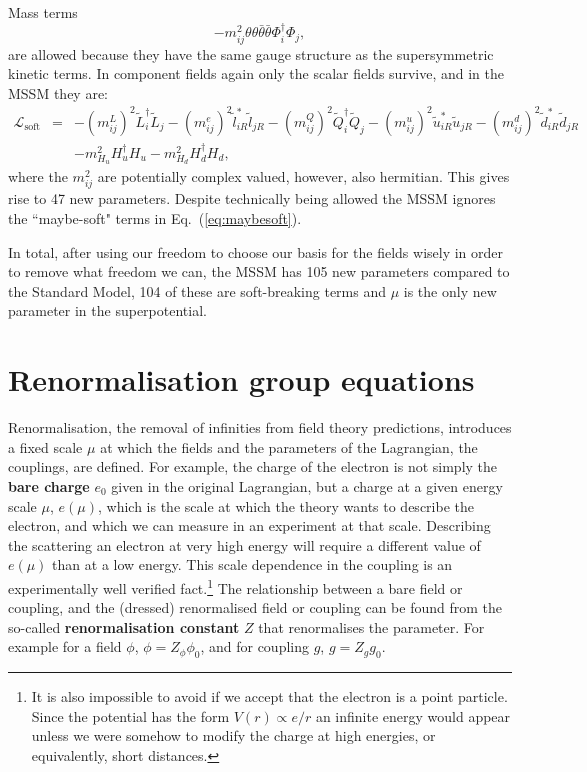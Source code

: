\documentclass[notes.tex]{subfiles}
\begin{document}
Mass terms
\[-m_{ij}^2\theta\theta\bar{\theta}\bar{\theta}\Phi^\dagger_i \Phi_j,\]
are allowed because they have the same gauge structure as the supersymmetric kinetic terms. In component fields again only the scalar fields survive, and in the MSSM they are:
\begin{eqnarray}
\mathcal L_\text{soft} &=& -(m^L_{ij})^2\tilde{L}_i^\dagger\tilde{L}_j -(m^e_{ij})^2\tilde{l}_{iR}^*\tilde{l}_{jR} - (m_{ij}^Q)^2\tilde{Q}_i^\dagger \tilde{Q}_j - (m^u_{ij})^2\tilde{u}^*_{iR}\tilde{u}_{jR} - (m_{ij}^d)^2\tilde{d}^*_{iR}\tilde{d}_{jR}\nonumber\\
&& - m_{H_u}^2H_u^\dagger H_u - m_{H_d}^2 H_d^\dagger H_d,
\label{eq:MSSM_soft_kin}
\end{eqnarray}
where the $m_{ij}^2$ are potentially complex valued, however, also hermitian. This gives rise to 47 new parameters. Despite technically being allowed the MSSM ignores the ``maybe-soft" terms in Eq.~(\ref{eq:maybesoft}).

In total, after using our freedom to choose our basis for the fields wisely in order to remove what freedom we can, the MSSM has 105 new parameters compared to the Standard Model, 104 of these are soft-breaking terms and $\mu$ is the only new parameter in the superpotential.



\section{Renormalisation group equations}
\label{sec:RGE}
Renormalisation, the removal of infinities from field theory predictions, introduces a fixed scale $\mu$ at which the fields and the parameters of the Lagrangian, the couplings, are defined. For example, the charge of the electron is not simply the {\bf bare charge} $e_0$ given in the original Lagrangian, but a charge at a given energy scale $\mu$, $e(\mu)$, which is the scale at which the theory wants to describe the electron, and which we can measure in an experiment at that scale. Describing the scattering an electron at very high energy will require a different value of $e(\mu)$ than at a low energy. This scale dependence in the coupling is an experimentally well verified fact.\footnote{It is also impossible to avoid if we accept that the electron is a point particle. Since the potential has the form $V(r)\propto e/r$ an infinite energy would appear unless we were somehow to modify the charge at high energies, or equivalently, short distances.} The relationship between a bare field or coupling, and the (dressed) renormalised field or coupling can be found from the so-called {\bf renormalisation constant} $Z$ that renormalises the parameter. For example for a field $\phi$, $\phi=Z_\phi \phi_0$, and for coupling $g$, $g=Z_gg_0$.
\end{document}
